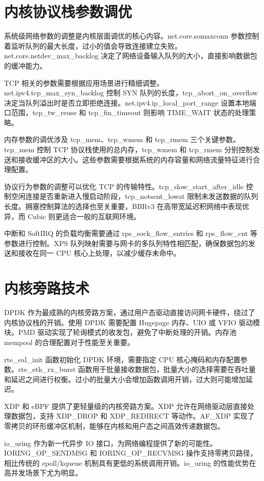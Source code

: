 \chapter{内核协议栈参数调优}
系统级网络参数的调整是内核层面调优的核心内容。net.core.somaxconn 参数控制着监听队列的最大长度，过小的值会导致连接建立失败。net.core.netdev\_{}max\_{}backlog 决定了网络设备输入队列的大小，直接影响数据包的缓冲能力。\par
TCP 相关的参数需要根据应用场景进行精细调整。net.ipv4.tcp\_{}max\_{}syn\_{}backlog 控制 SYN 队列的长度，tcp\_{}abort\_{}on\_{}overflow 决定当队列溢出时是否立即拒绝连接。net.ipv4.ip\_{}local\_{}port\_{}range 设置本地端口范围，tcp\_{}tw\_{}reuse 和 tcp\_{}fin\_{}timeout 则影响 TIME\_{}WAIT 状态的处理策略。\par
内存参数的调优涉及 tcp\_{}mem、tcp\_{}wmem 和 tcp\_{}rmem 三个关键参数。tcp\_{}mem 控制 TCP 协议栈使用的总内存，tcp\_{}wmem 和 tcp\_{}rmem 分别控制发送和接收缓冲区的大小。这些参数需要根据系统的内存容量和网络流量特征进行合理配置。\par
协议行为参数的调整可以优化 TCP 的传输特性。tcp\_{}slow\_{}start\_{}after\_{}idle 控制空闲连接是否重新进入慢启动阶段，tcp\_{}notsent\_{}lowat 限制未发送数据的队列长度。拥塞控制算法的选择也至关重要，BBRv3 在高带宽延迟积网络中表现优异，而 Cubic 则更适合一般的互联网环境。\par
中断和 SoftIRQ 的负载均衡需要通过 rps\_{}sock\_{}flow\_{}entries 和 rps\_{}flow\_{}cnt 等参数进行控制。XPS 队列映射需要与网卡的多队列特性相匹配，确保数据包的发送和接收在同一 CPU 核心上处理，以减少缓存未命中。\par
\chapter{内核旁路技术}
DPDK 作为最成熟的内核旁路方案，通过用户态驱动直接访问网卡硬件，绕过了内核协议栈的开销。使用 DPDK 需要配置 Hugepage 内存、UIO 或 VFIO 驱动模块。PMD 驱动实现了轮询模式的收发包，避免了中断处理的开销。内存池 mempool 的合理配置对于性能至关重要。\par
rte\_{}eal\_{}init 函数初始化 DPDK 环境，需要指定 CPU 核心掩码和内存配置参数。rte\_{}eth\_{}rx\_{}burst 函数用于批量接收数据包，批量大小的选择需要在吞吐量和延迟之间进行权衡。过小的批量大小会增加函数调用开销，过大则可能增加延迟。\par
XDP 和 eBPF 提供了更轻量级的内核旁路方案。XDP 允许在网络驱动层直接处理数据包，支持 XDP\_{}DROP 和 XDP\_{}REDIRECT 等动作。AF\_{}XDP 实现了零拷贝的环形缓冲区机制，能够在内核和用户态之间高效传递数据包。\par
io\_{}uring 作为新一代异步 IO 接口，为网络编程提供了新的可能性。IORING\_{}OP\_{}SENDMSG 和 IORING\_{}OP\_{}RECVMSG 操作支持零拷贝路径，相比传统的 epoll/kqueue 机制具有更低的系统调用开销。io\_{}uring 的性能优势在高并发场景下尤为明显。\par
